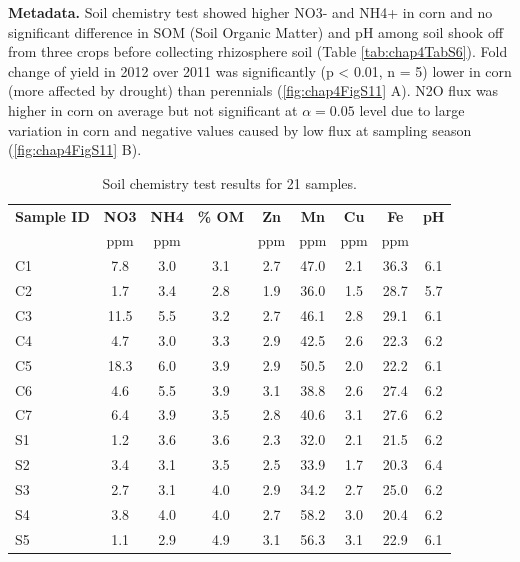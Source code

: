 \documentclass[]{msu-thesis}
\begin{document}
\textbf{Metadata. }
Soil chemistry test showed higher NO3- and NH4+ in corn and no significant difference in SOM (Soil Organic Matter) and pH among soil shook off from three crops before collecting rhizosphere soil (Table \ref{tab:chap4TabS6}). Fold change of yield in 2012 over 2011 was significantly (p < 0.01, n = 5) lower in corn (more affected by drought) than perennials (\cref{fig:chap4FigS11} A). N2O flux was higher in corn on average but not significant at $\alpha = 0.05$ level due to large variation in corn and negative values caused by low flux at sampling season (\cref{fig:chap4FigS11} B).


\begin{table}[htbp]
  \centering
  \caption[Soil chemistry test results for 21 samples]{Soil chemistry test results for 21 samples.}
    \begin{tabular}{|lcccccccc|}
    \toprule
    \multicolumn{1}{|c}{\textbf{Sample ID}} & \textbf{NO3} & \textbf{NH4} & \textbf{\% OM} & \textbf{Zn} & \textbf{Mn} & \textbf{Cu} & \textbf{Fe} & \textbf{pH} \\
          & ppm   & ppm   &       & ppm   & ppm   & ppm   & ppm   &  \\
    \midrule
    C1    & 7.8   & 3.0   & 3.1   & 2.7   & 47.0  & 2.1   & 36.3  & 6.1 \\
    C2    & 1.7   & 3.4   & 2.8   & 1.9   & 36.0  & 1.5   & 28.7  & 5.7 \\
    C3    & 11.5  & 5.5   & 3.2   & 2.7   & 46.1  & 2.8   & 29.1  & 6.1 \\
    C4    & 4.7   & 3.0   & 3.3   & 2.9   & 42.5  & 2.6   & 22.3  & 6.2 \\
    C5    & 18.3  & 6.0   & 3.9   & 2.9   & 50.5  & 2.0   & 22.2  & 6.1 \\
    C6    & 4.6   & 5.5   & 3.9   & 3.1   & 38.8  & 2.6   & 27.4  & 6.2 \\
    C7    & 6.4   & 3.9   & 3.5   & 2.8   & 40.6  & 3.1   & 27.6  & 6.2 \\
    S1    & 1.2   & 3.6   & 3.6   & 2.3   & 32.0  & 2.1   & 21.5  & 6.2 \\
    S2    & 3.4   & 3.1   & 3.5   & 2.5   & 33.9  & 1.7   & 20.3  & 6.4 \\
    S3    & 2.7   & 3.1   & 4.0   & 2.9   & 34.2  & 2.7   & 25.0  & 6.2 \\
    S4    & 3.8   & 4.0   & 4.0   & 2.7   & 58.2  & 3.0   & 20.4  & 6.2 \\
    S5    & 1.1   & 2.9   & 4.9   & 3.1   & 56.3  & 3.1   & 22.9  & 6.1 \\

\end{tabular}
\end{table}
\end{document}

